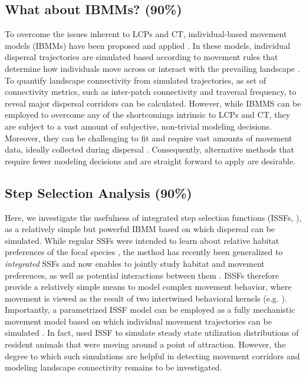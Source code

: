 \documentclass[abstract=on,10pt,a4paper,bibliography=totocnumbered]{article}
\begin{document}
\subsection{What about IBMMs? (90\%)}
To overcome the issues inherent to LCPs and CT, individual-based movement models
(IBMMs) have been proposed and applied \citep{Diniz.2020}. In these models,
individual dispersal trajectories are simulated based according to movement
rules that determine how individuals move across or interact with the prevailing
landscape \citep{Gustafson.1996, Gardner.2004, Graf.2007, KramerSchadt.2004,
Revilla.2004, Revilla.2008, Kanagaraj.2013, Clark.2015, Allen.2016,
Hauenstein.2019, Zeller.2020, Vasudev.2021}. To quantify landscape connectivity
from simulated trajectories, as set of connectivity metrics, such as inter-patch
connectivity and traversal frequency, to reveal major dispersal corridors
\citep{Kanagaraj.2013, BastilleRousseau.2018, Hauenstein.2019, Zeller.2020} can
be calculated. However, while IBMMS can be employed to overcome any of the
shortcomings intrinsic to LCPs and CT, they are subject to a vast amount of
subjective, non-trivial modeling decisions. Moreover, they can be challenging to
fit and require vast amounts of movement data, ideally collected during
dispersal \citep{Diniz.2020}. Consequently, alternative methods that require
fewer modeling decisions and are straight forward to apply are desirable.

\subsection{Step Selection Analysis (90\%)}
Here, we investigate the usefulness of integrated step selection functions
(ISSFs, \citealp{Avgar.2016}), as a relatively simple but powerful IBMM based on
which dispersal can be simulated. While regular SSFs were intended to learn
about relative habitat preferences of the focal species \citep{Fortin.2005,
Thurfjell.2014, Avgar.2017}, the method has recently been generalized to
\textit{integrated} SSFs and now enables to jointly study habitat and movement
preferences, as well as potential interactions between them \citep{Avgar.2016,
Signer.2017, Fieberg.2020}. ISSFs therefore provide a relatively simple means to
model complex movement behavior, where movement is viewed as the result of two
intertwined behavioral kernels (e.g. \citealp{Prokopenko.2017, Munden.2020}).
Importantly, a parametrized ISSF model can be employed as a fully mechanistic
movement model based on which individual movement trajectories can be simulated
\citep{Avgar.2016, Signer.2017}. In fact, \cite{Signer.2017} used ISSF to
simulate steady state utilization distributions of resident animals that were
moving around a point of attraction. However, the degree to which such
simulations are helpful in detecting movement corridors and modeling landscape
connectivity remains to be investigated.
\end{document}
